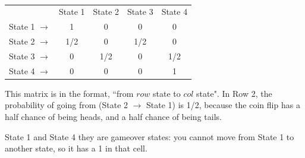 \documentclass[a4paper,12pt]{book}
\begin{document}
{\begin{intro}{\ }
            \begin{center}
                \begin{tabular}{l c c c c}
                    & State 1 & State 2 & State 3 & State 4
                    \\
                    State 1 $\to$ &
                        1 & 0 & 0 & 0
                    \\
                    State 2 $\to$ &
                        1/2 & 0 & 1/2 & 0
                    \\
                    State 3 $\to$ &
                        0 & 1/2 & 0 & 1/2
                    \\
                    State 4 $\to$ &
                        0 & 0 & 0 & 1
                \end{tabular}
            \end{center}

            This matrix is in the format, ``from $row$ state to $col$ state".
            In Row 2, the probability of going from (State 2 $\to$ State 1) is 1/2,
            because the coin flip has a half chance of being heads, and a half chance
            of being tails.

            State 1 and State 4 they are gameover states: you cannot
            move from State 1 to another state, so it has a 1 in that cell.
            
        \end{intro}
    }{}
    
        \notonkey{ \newpage }{ \hrulefill }
        
\end{document}
